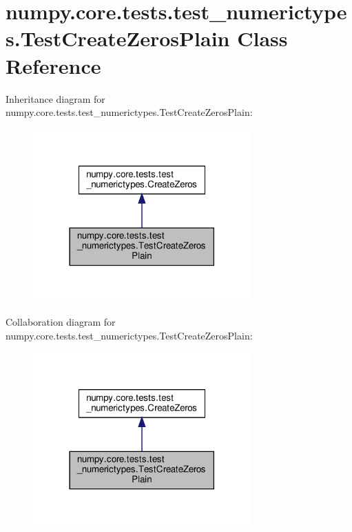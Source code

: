 \hypertarget{classnumpy_1_1core_1_1tests_1_1test__numerictypes_1_1TestCreateZerosPlain}{}\section{numpy.\+core.\+tests.\+test\+\_\+numerictypes.\+Test\+Create\+Zeros\+Plain Class Reference}
\label{classnumpy_1_1core_1_1tests_1_1test__numerictypes_1_1TestCreateZerosPlain}


Inheritance diagram for numpy.\+core.\+tests.\+test\+\_\+numerictypes.\+Test\+Create\+Zeros\+Plain\+:
\nopagebreak
\begin{figure}[H]
\begin{center}
\leavevmode
\includegraphics[width=237pt]{classnumpy_1_1core_1_1tests_1_1test__numerictypes_1_1TestCreateZerosPlain__inherit__graph}
\end{center}
\end{figure}


Collaboration diagram for numpy.\+core.\+tests.\+test\+\_\+numerictypes.\+Test\+Create\+Zeros\+Plain\+:
\nopagebreak
\begin{figure}[H]
\begin{center}
\leavevmode
\includegraphics[width=237pt]{classnumpy_1_1core_1_1tests_1_1test__numerictypes_1_1TestCreateZerosPlain__coll__graph}
\end{center}
\end{figure}
